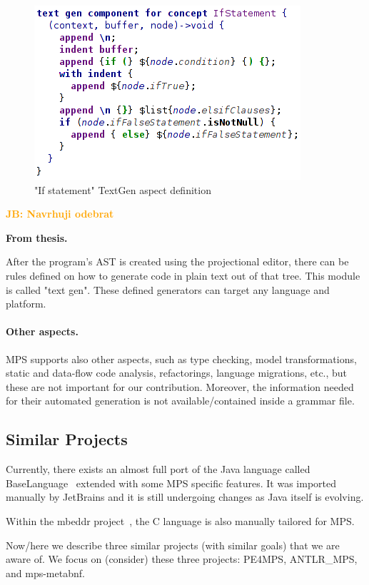 \documentclass[10pt]{sigplanconf}
\newcommand{\todo}[1]{{\bfseries #1}}
\newcommand{\JB}[1]{\textcolor{orange}{\bfseries JB: #1}} %
\begin{document}
\begin{figure}[ht]
	\centering
	\includegraphics[scale=0.6]{./images/if_statement_textgen.png}
	\caption{"If statement" TextGen aspect definition}
	\label{fig:if_statement_textgen}
\end{figure}

\JB{Navrhuji odebrat}
\todo{From thesis.

After the program's AST is created using the projectional editor, there can be rules defined on how to generate code in plain text out of that tree.
This module is called "text gen".
These defined generators can target any language and platform.

\paragraph{Other aspects.}
MPS supports also other aspects, such as type checking, model transformations, static and data-flow code analysis, refactorings, language migrations, etc., but these are not important for our contribution. Moreover, the information needed for their automated generation is not available/contained inside a grammar file.

}

\subsection{Similar Projects}

Currently, there exists an almost full port of the Java language called BaseLanguage~\cite{ref:BaseLanguage} extended with some MPS specific features.
It was imported manually by JetBrains and it is still undergoing changes as Java itself is evolving.

Within the mbeddr project~\cite{ref:mbeddr}, the C language is also manually tailored for MPS.

Now/here we describe three similar projects (with similar goals) that we are aware of.
We focus on (consider) these three projects: PE4MPS, ANTLR{\_}MPS, and mps-metabnf.
\end{document}
